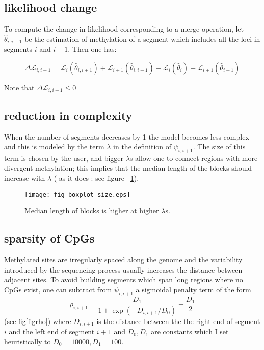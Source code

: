 \documentclass[12pt]{amsart}
\newcommand{\lik}{\ensuremath{\mathcal{L}}}
\begin{document}
\subsection{likelihood change}

To compute the change in likelihood corresponding to a merge operation, let 
$\hat{\theta}_{i,i+1}$ be the  estimation of methylation of 
a segment which includes
all the loci in segments $i$ and $i+1$. Then one has:

\[\Delta  \lik_{i,i+1} = \lik_i(\hat{\theta}_{i,i+1})+
	\lik_{i+1}(\hat{\theta}_{i,i+1}) 
	-\lik_i(\hat{\theta}_{i})
	-\lik_{i+1}(\hat{\theta}_{i+1}) \] 

Note that $\Delta  \lik_{i,i+1} \leq 0$

\subsection{reduction in complexity}

When the number of segments decreases by 1 the model becomes less complex
and this is modeled by the term $\lambda$ in the definition of $\psi_{i,i+1}$.
The size of this term is chosen by the user, and bigger $\lambda$s allow one to connect
regions with more divergent methylation; this implies that the median length of
the blocks should increase with $\lambda$ 
( as it does : see figure ~\ref{fig_boxplot_size}).

\begin{figure}
\texttt{[image: fig\_boxplot\_size.eps]}
\caption{Median length of blocks is higher at higher $\lambda$s.}
\label{fig_boxplot_size}
\end{figure}

\subsection{sparsity of CpGs}

Methylated sites are irregularly 
spaced along the genome and the variability 
introduced by the sequencing process usually increases the distance 
between adjacent sites.
To avoid building segments which span long regions where no CpGs exist, one 
can subtract from $\psi_{i,i+1}$ a sigmoidal penalty term of the
form \[\rho_{i,i+1}=\frac{D_1}{1+\exp(-D_{i,i+1}/D_0)}-\frac{D_1}{2}\] (see fig\ref{figrho}) 
where $D_{i,i+1}$ is the distance 
between the the right end of segment $i$ and the left end of segment $i+1$ and 
$D_0,D_1$ are constants which  I set heuristically to  $D_0=10000,D_1=100$. 
\end{document}
